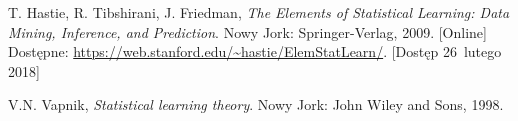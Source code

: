 \documentclass[11pt,a4paper]{article}
\begin{document}

\begin{thebibliography}{9}

        T. Hastie,
        R. Tibshirani,
        J. Friedman,
        \emph{The Elements of Statistical Learning: Data Mining, Inference, and Prediction}.
        Nowy Jork: Springer-Verlag,
        2009.
        [Online] \\
        Dostępne: \url{https://web.stanford.edu/~hastie/ElemStatLearn/}.
        [Dostęp 26~lutego 2018]

        V.N. Vapnik,
        \emph{Statistical learning theory}.
        Nowy Jork: John Wiley and Sons,
        1998.

\end{thebibliography}
\end{document}
